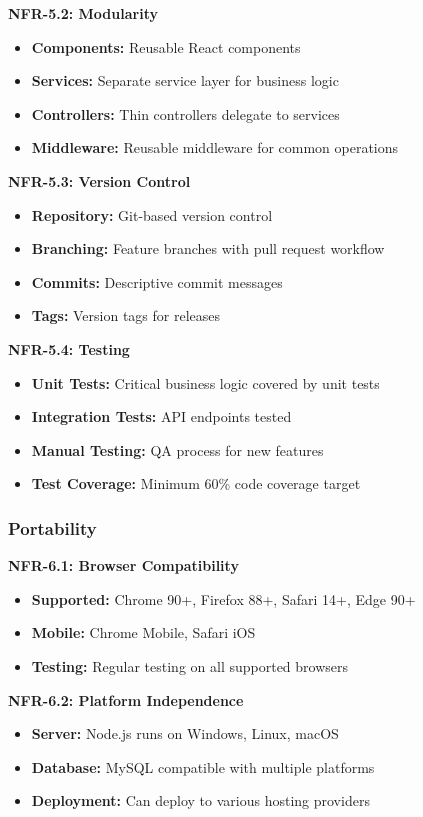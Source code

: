 \documentclass[12pt,a4paper]{article}
\begin{document}
\textbf{NFR-5.2: Modularity}
\begin{itemize}
    \item \textbf{Components:} Reusable React components
    \item \textbf{Services:} Separate service layer for business logic
    \item \textbf{Controllers:} Thin controllers delegate to services
    \item \textbf{Middleware:} Reusable middleware for common operations
\end{itemize}

\textbf{NFR-5.3: Version Control}
\begin{itemize}
    \item \textbf{Repository:} Git-based version control
    \item \textbf{Branching:} Feature branches with pull request workflow
    \item \textbf{Commits:} Descriptive commit messages
    \item \textbf{Tags:} Version tags for releases
\end{itemize}

\textbf{NFR-5.4: Testing}
\begin{itemize}
    \item \textbf{Unit Tests:} Critical business logic covered by unit tests
    \item \textbf{Integration Tests:} API endpoints tested
    \item \textbf{Manual Testing:} QA process for new features
    \item \textbf{Test Coverage:} Minimum 60\% code coverage target
\end{itemize}

\subsubsection{Portability}

\textbf{NFR-6.1: Browser Compatibility}
\begin{itemize}
    \item \textbf{Supported:} Chrome 90+, Firefox 88+, Safari 14+, Edge 90+
    \item \textbf{Mobile:} Chrome Mobile, Safari iOS
    \item \textbf{Testing:} Regular testing on all supported browsers
\end{itemize}

\textbf{NFR-6.2: Platform Independence}
\begin{itemize}
    \item \textbf{Server:} Node.js runs on Windows, Linux, macOS
    \item \textbf{Database:} MySQL compatible with multiple platforms
    \item \textbf{Deployment:} Can deploy to various hosting providers
\end{itemize}
\end{document}
